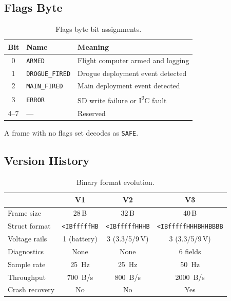 \documentclass[11pt, a4paper, twoside]{article}
\begin{document}
\subsection{Flags Byte}
\label{sec:flags}

\begin{table}[ht]
\centering
\caption{Flags byte bit assignments.}
\label{tab:flags}
\begin{tabular}{c l l}
\toprule
\textbf{Bit} & \textbf{Name} & \textbf{Meaning} \\
\midrule
0 & \texttt{ARMED} & Flight computer armed and logging \\
1 & \texttt{DROGUE\_FIRED} & Drogue deployment event detected \\
2 & \texttt{MAIN\_FIRED} & Main deployment event detected \\
3 & \texttt{ERROR} & SD write failure or I\textsuperscript{2}C fault \\
4--7 & --- & Reserved \\
\bottomrule
\end{tabular}
\end{table}

A frame with no flags set decodes as \texttt{SAFE}.

\subsection{Version History}
\label{sec:format-versions}

\begin{table}[ht]
\centering
\caption{Binary format evolution.}
\label{tab:versions}
\begin{tabular}{l c c c}
\toprule
& \textbf{V1} & \textbf{V2} & \textbf{V3} \\
\midrule
Frame size & 28\,B & 32\,B & 40\,B \\
Struct format & \texttt{<IBfffffHB} & \texttt{<IBfffffHHHB} & \texttt{<IBfffffHHHBHHBBBB} \\
Voltage rails & 1 (battery) & 3 (3.3/5/9\,V) & 3 (3.3/5/9\,V) \\
Diagnostics & None & None & 6 fields \\
Sample rate & \SI{25}{\hertz} & \SI{25}{\hertz} & \SI{50}{\hertz} \\
Throughput & \SI{700}{B/s} & \SI{800}{B/s} & \SI{2000}{B/s} \\
Crash recovery & No & No & Yes \\
\bottomrule
\end{tabular}
\end{table}
\end{document}
